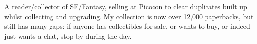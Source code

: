 A reader/collector of SF/Fantasy, selling at Picocon to
clear duplicates built up whilst collecting and upgrading. My
collection is now over 12,000 paperbacks, but still has many gaps: if
anyone has collectibles for sale, or wants to buy, or indeed just
wants a chat, stop by during the day.
